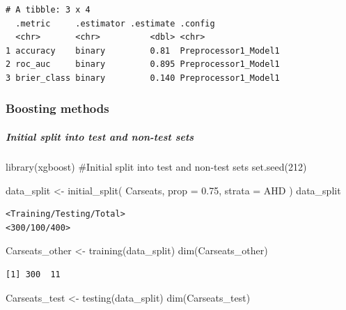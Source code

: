 \documentclass[
]{article}
\let\oldsubparagraph\subparagraph
\renewcommand{\subparagraph}[1]{\oldsubparagraph{#1}\mbox{}}
\newenvironment{Shaded}{\begin{snugshade}}{\end{snugshade}}
\newcommand{\AttributeTok}[1]{\textcolor[rgb]{0.40,0.45,0.13}{#1}}
\newcommand{\CommentTok}[1]{\textcolor[rgb]{0.37,0.37,0.37}{#1}}
\newcommand{\DecValTok}[1]{\textcolor[rgb]{0.68,0.00,0.00}{#1}}
\newcommand{\FloatTok}[1]{\textcolor[rgb]{0.68,0.00,0.00}{#1}}
\newcommand{\FunctionTok}[1]{\textcolor[rgb]{0.28,0.35,0.67}{#1}}
\newcommand{\NormalTok}[1]{\textcolor[rgb]{0.00,0.23,0.31}{#1}}
\newcommand{\OtherTok}[1]{\textcolor[rgb]{0.00,0.23,0.31}{#1}}
\begin{document}
\begin{verbatim}
# A tibble: 3 x 4
  .metric     .estimator .estimate .config             
  <chr>       <chr>          <dbl> <chr>               
1 accuracy    binary         0.81  Preprocessor1_Model1
2 roc_auc     binary         0.895 Preprocessor1_Model1
3 brier_class binary         0.140 Preprocessor1_Model1
\end{verbatim}

\hypertarget{boosting-methods-1}{%
\subsubsection{Boosting methods}\label{boosting-methods-1}}

\hypertarget{initial-split-into-test-and-non-test-sets-3}{%
\subparagraph{Initial split into test and non-test
sets}\label{initial-split-into-test-and-non-test-sets-3}}

\begin{Shaded}
\begin{Highlighting}[]
\FunctionTok{library}\NormalTok{(xgboost)}
\CommentTok{\#Initial split into test and non{-}test sets}
\FunctionTok{set.seed}\NormalTok{(}\DecValTok{212}\NormalTok{)}

\NormalTok{data\_split }\OtherTok{\textless{}{-}} \FunctionTok{initial\_split}\NormalTok{(}
\NormalTok{  Carseats, }
  \AttributeTok{prop =} \FloatTok{0.75}\NormalTok{,}
  \AttributeTok{strata =}\NormalTok{ AHD}
\NormalTok{  )}
\NormalTok{data\_split}
\end{Highlighting}
\end{Shaded}

\begin{verbatim}
<Training/Testing/Total>
<300/100/400>
\end{verbatim}

\begin{Shaded}
\begin{Highlighting}[]
\NormalTok{Carseats\_other }\OtherTok{\textless{}{-}} \FunctionTok{training}\NormalTok{(data\_split)}
\FunctionTok{dim}\NormalTok{(Carseats\_other)}
\end{Highlighting}
\end{Shaded}

\begin{verbatim}
[1] 300  11
\end{verbatim}

\begin{Shaded}
\begin{Highlighting}[]
\NormalTok{Carseats\_test }\OtherTok{\textless{}{-}} \FunctionTok{testing}\NormalTok{(data\_split)}
\FunctionTok{dim}\NormalTok{(Carseats\_test)}
\end{Highlighting}
\end{Shaded}
\end{document}
